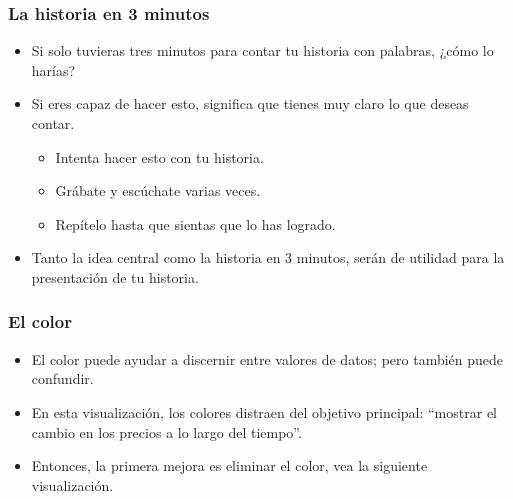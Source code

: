 \documentclass[
  letterpaper,
  DIV=11,
  numbers=noendperiod]{scrreprt}
\providecommand{\tightlist}{%
  \setlength{\itemsep}{0pt}\setlength{\parskip}{0pt}}\usepackage{longtable,booktabs,array}
\begin{document}
\subsubsection{La historia en 3 minutos}\label{la-historia-en-3-minutos}

\begin{itemize}
\tightlist
\item
  Si solo tuvieras tres minutos para contar tu historia con palabras,
  ¿cómo lo harías?
\item
  Si eres capaz de hacer esto, significa que tienes muy claro lo que
  deseas contar.

  \begin{itemize}
  \tightlist
  \item
    Intenta hacer esto con tu historia.
  \item
    Grábate y escúchate varias veces.
  \item
    Repítelo hasta que sientas que lo has logrado.
  \end{itemize}
\item
  Tanto la idea central como la historia en 3 minutos, serán de utilidad
  para la presentación de tu historia.
\end{itemize}

\subsubsection{El color}\label{el-color}

\begin{itemize}
\tightlist
\item
  El color puede ayudar a discernir entre valores de datos; pero también
  puede confundir.
\item
  En esta visualización, los colores distraen del objetivo principal:
  ``mostrar el cambio en los precios a lo largo del tiempo''.
\item
  Entonces, la primera mejora es eliminar el color, vea la siguiente
  visualización.
\end{itemize}
\end{document}
